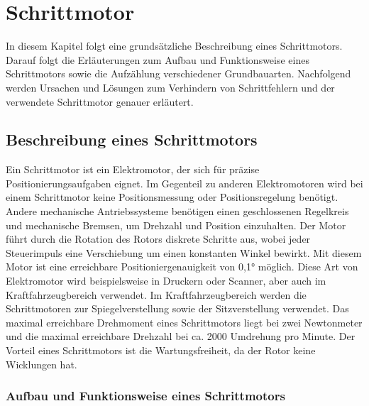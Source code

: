 %
%
%

	

\chapter{Schrittmotor}

In diesem Kapitel folgt eine grundsätzliche Beschreibung eines Schrittmotors. Darauf folgt die Erläuterungen zum Aufbau und Funktionsweise eines Schrittmotors sowie die Aufzählung verschiedener Grundbauarten. Nachfolgend werden Ursachen und Lösungen zum Verhindern von Schrittfehlern und der verwendete Schrittmotor genauer erläutert.

\section{Beschreibung eines Schrittmotors}

Ein Schrittmotor ist ein Elektromotor, der sich für präzise Positionierungsaufgaben eignet. Im Gegenteil zu anderen Elektromotoren wird bei einem Schrittmotor keine Positionsmessung oder Positionsregelung benötigt. Andere mechanische Antriebssysteme benötigen einen geschlossenen Regelkreis und mechanische Bremsen, um Drehzahl und Position einzuhalten. Der Motor führt durch die Rotation des Rotors diskrete Schritte aus, wobei jeder Steuerimpuls eine Verschiebung um einen konstanten Winkel bewirkt. Mit diesem Motor ist eine erreichbare Positioniergenauigkeit von 0,1° möglich. Diese Art von Elektromotor wird beispielsweise in Druckern oder Scanner, aber auch im Kraftfahrzeugbereich verwendet. Im Kraftfahrzeugbereich werden die Schrittmotoren zur Spiegelverstellung sowie der Sitzverstellung verwendet. Das maximal erreichbare Drehmoment eines Schrittmotors liegt bei zwei Newtonmeter und die maximal erreichbare Drehzahl bei ca. 2000 Umdrehung pro Minute. Der Vorteil eines Schrittmotors ist die Wartungsfreiheit, da der Rotor keine Wicklungen hat. \cite{Babiel:2023,Hagl:2021,Bernstein:2018,Schroeder:2021}

\subsection{Aufbau und Funktionsweise eines Schrittmotors}

